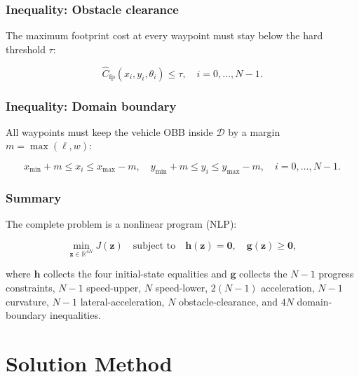 \documentclass[11pt,a4paper]{article}
\begin{document}
\subsubsection*{Inequality: Obstacle clearance}

The maximum footprint cost at every waypoint must stay below the hard threshold
$\tau$:

\begin{equation}
  \hat{C}_{\mathrm{fp}}(x_i, y_i, \theta_i) \le \tau,
  \quad i = 0, \ldots, N-1.
\end{equation}

\subsubsection*{Inequality: Domain boundary}

All waypoints must keep the vehicle OBB inside $\mathcal{D}$ by a margin
$m = \max(\ell, w)$:

\begin{equation}
  x_{\min} + m \le x_i \le x_{\max} - m, \quad
  y_{\min} + m \le y_i \le y_{\max} - m,
  \quad i = 0, \ldots, N-1.
\end{equation}

\subsubsection*{Summary}

The complete problem is a nonlinear program (NLP):

\begin{equation}
  \label{eq:nlp}
  \min_{\mathbf{z} \in \mathbb{R}^{4N}} J(\mathbf{z})
  \quad \text{subject to} \quad
  \mathbf{h}(\mathbf{z}) = \mathbf{0},\quad
  \mathbf{g}(\mathbf{z}) \ge \mathbf{0},
\end{equation}

where $\mathbf{h}$ collects the four initial-state equalities and $\mathbf{g}$
collects the $N-1$ progress constraints, $N-1$ speed-upper, $N$ speed-lower,
$2(N-1)$ acceleration, $N-1$ curvature, $N-1$ lateral-acceleration, $N$
obstacle-clearance, and $4N$ domain-boundary inequalities.

\section{Solution Method}
\end{document}
